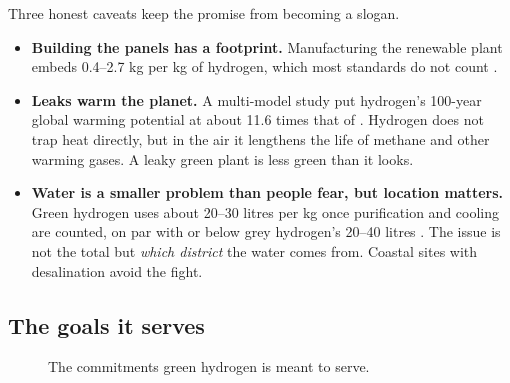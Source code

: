Three honest caveats keep the promise from becoming a slogan.

\begin{itemize}
\item \textbf{Building the panels has a footprint.} Manufacturing the renewable plant embeds 0.4–2.7 kg \coo{} per kg of hydrogen, which most standards do not count \cite{ieaghr2024}. \confH
\item \textbf{Leaks warm the planet.} A multi-model study put hydrogen's 100-year global warming potential at about 11.6 times that of \coo{} \cite{sand2023}. Hydrogen does not trap heat directly, but in the air it lengthens the life of methane and other warming gases. A leaky green plant is less green than it looks. \confM
\item \textbf{Water is a smaller problem than people fear, but location matters.} Green hydrogen uses about 20–30 litres per kg once purification and cooling are counted, on par with or below grey hydrogen's 20–40 litres \cite{rmi2023}. The issue is not the total but \emph{which district} the water comes from. Coastal sites with desalination avoid the fight. \confH
\end{itemize}

\subsection{The goals it serves}

\begin{figure}[H]
\centering
{}
\caption{The commitments green hydrogen is meant to serve.}
\end{figure}

